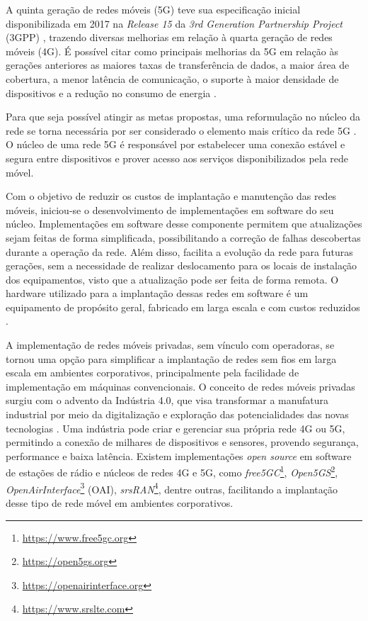 A quinta geração de redes móveis (5G) teve sua especificação inicial disponibilizada em 2017 na \textit{Release 15} da \textit{3rd Generation Partnership Project} (3GPP) \cite{Redana2020}, trazendo diversas melhorias em relação à quarta geração de redes móveis (4G).
É possível citar como principais melhorias da 5G em relação às gerações anteriores as maiores taxas de transferência de dados, a maior área de cobertura, a menor latência de comunicação, o suporte à maior densidade de dispositivos e a redução no consumo de energia \cite{Ahmad2019}.

Para que seja possível atingir as metas propostas, uma reformulação no núcleo da rede se torna necessária por ser considerado o elemento mais crítico da rede 5G \cite{Cardoso2020}.
O núcleo de uma rede 5G é responsável por estabelecer uma conexão estável e segura entre dispositivos e prover acesso aos serviços disponibilizados pela rede móvel.

Com o objetivo de reduzir os custos de implantação e manutenção das redes móveis, iniciou-se o desenvolvimento de implementações em software do seu núcleo.
Implementações em software desse componente permitem que atualizações sejam feitas de forma simplificada, possibilitando a correção de falhas descobertas durante a operação da rede. Além disso, facilita a evolução da rede para futuras gerações, sem a necessidade de realizar deslocamento para os locais de instalação dos equipamentos, visto que a atualização pode ser feita de forma remota.
O hardware utilizado para a implantação dessas redes em software é um equipamento de propósito geral, fabricado em larga escala e com custos reduzidos \cite{Cardoso2020}.

A implementação de redes móveis privadas, sem vínculo com operadoras, se tornou uma opção para simplificar a implantação de redes sem fios em larga escala em ambientes corporativos, principalmente pela facilidade de implementação em máquinas convencionais.
O conceito de redes móveis privadas surgiu com o advento da Indústria 4.0, que visa transformar a manufatura industrial por meio da digitalização e exploração das potencialidades das novas tecnologias \cite{Rojko2017}.
Uma indústria pode criar e gerenciar sua própria rede 4G ou 5G, permitindo a conexão de milhares de dispositivos e sensores, provendo segurança, performance e baixa latência.
Existem implementações \textit{open source} em software de estações de rádio e núcleos de redes 4G e 5G, como \textit{free5GC}\footnote{\url{https://www.free5gc.org}}, \textit{Open5GS}\footnote{\url{https://open5gs.org}}, \textit{OpenAirInterface}\footnote{\url{https://openairinterface.org}} (OAI), \textit{srsRAN}\footnote{\url{https://www.srslte.com}}, dentre outras, facilitando a implantação desse tipo de rede móvel em ambientes corporativos.

